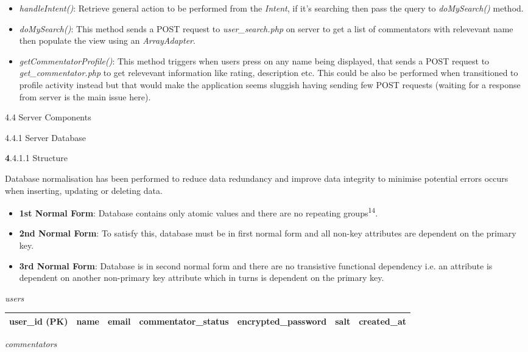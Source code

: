 \documentclass{article}
\begin{document}
\begin{flushleft}
\begin{itemize}
	\item \textit{handleIntent()}: Retrieve general action to be performed from the \textit{Intent}, if it's searching then pass the query to \textit{doMySearch()} method.
	\item \textit{doMySearch()}: This method sends a POST request to \textit{user\_search.php} on server to get a list of commentators with relevevant name then populate the view using an \textit{ArrayAdapter}.\\
	\item \textit{getCommentatorProfile()}: This method triggers when users press on any name being displayed, that sends a POST request to \textit{get\_commentator.php} to get relevevant information like rating, description etc. This could be also be performed when transitioned to profile activity instead but that would make the application seems sluggish having sending few POST requests (waiting for a response from server is the main issue here).
\end{itemize}
{\Large 4.4 Server Components}\par
{\large 4.4.1 Server Database}\par
{\textbf 4.4.1.1 Structure}\par
Database normalisation has been performed to reduce data redundancy and improve data integrity to minimise potential errors occurs when inserting, updating or deleting data.\par
\begin{itemize}
	\item \textbf{1st Normal Form}: Database contains only atomic values and there are no repeating groups\textsuperscript{14}.
	\item \textbf{2nd Normal Form}: To satisfy this, database must be in first normal form and all non-key attributes are dependent on the primary key.
	\item \textbf{3rd Normal Form}: Database is in second normal form and there are no transistive functional dependency i.e. an attribute is dependent on another non-primary key attribute which in turns is dependent on the primary key.
\end{itemize}
\textit{users}
\begin{tabular}{| c | c | c | c | c | c | c |}
\hline
user\_id (PK) & name & email & commentator\_status & encrypted\_password & salt & created\_at\\
\hline
\end{tabular}
\textit{commentators}\\
\begin{tabular}{| c | c | c | c |}

\end{tabular}
\end{flushleft}
\end{document}
